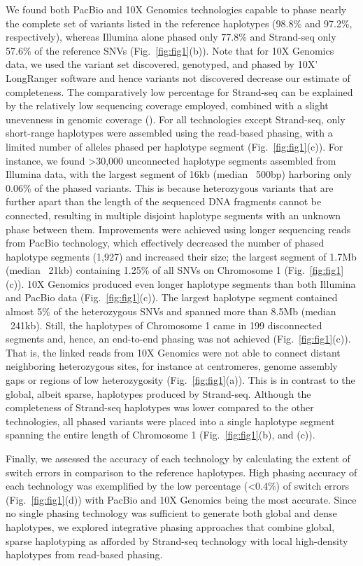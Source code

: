 	
	We found both PacBio and 10X Genomics technologies capable to phase nearly the complete set of variants listed in the reference haplotypes (98.8\% and 97.2\%, respectively), 
	whereas Illumina alone phased only 77.8\% and Strand-seq only 57.6\% of the reference SNVs (Fig.~\ref{fig:fig1}(b)). 
	Note that for 10X Genomics data, we used the variant set discovered, genotyped, and phased by 10X’ LongRanger software and hence variants not discovered decrease our estimate of completeness.
	The comparatively low percentage for Strand-seq can be explained by the relatively low sequencing coverage employed, combined with a slight unevenness in genomic coverage (). 
	For all technologies except Strand-seq, only short-range haplotypes were assembled using the read-based phasing, with a limited number of alleles phased per haplotype segment (Fig.~\ref{fig:fig1}(c)). 
	For instance, we found >30,000 unconnected haplotype segments assembled from Illumina data, with the largest segment of 16kb (median ~500bp) harboring only 0.06\% of the phased variants. 
	This is because heterozygous variants that are further apart than the length of the sequenced DNA fragments cannot be connected, resulting in multiple disjoint haplotype segments with an unknown phase between them. 
	Improvements were achieved using longer sequencing reads from PacBio technology, which effectively decreased the number of phased haplotype segments (1,927) and increased their size; the largest segment of 1.7Mb (median ~21kb) 
	containing 1.25\% of all SNVs on Chromosome 1 (Fig.~\ref{fig:fig1}(c)). 10X Genomics produced even longer haplotype segments than both Illumina and PacBio data (Fig.~\ref{fig:fig1}(c)). 
	The largest haplotype segment contained almost 5\% of the heterozygous SNVs and spanned more than 8.5Mb (median ~241kb). Still, the haplotypes of Chromosome 1 came in 199 disconnected segments and, 
	hence, an end-to-end phasing was not achieved (Fig.~\ref{fig:fig1}(c)). That is, the linked reads from 10X Genomics were not able to connect distant neighboring heterozygous sites, for instance at centromeres, 
	genome assembly gaps or regions of low heterozygosity (Fig.~\ref{fig:fig1}(a)). 
	This is in contrast to the global, albeit sparse, haplotypes produced by Strand-seq. 
	Although the completeness of Strand-seq haplotypes was lower compared to the other technologies, all phased variants were placed into a single haplotype segment spanning the entire length of Chromosome 1 (Fig.~\ref{fig:fig1}(b), and (c)).
	
	
	Finally, we assessed the accuracy of each technology by calculating the extent of switch errors in comparison to the reference haplotypes. High phasing accuracy of each technology was exemplified by the low percentage (<0.4\%) 
	of switch errors (Fig.~\ref{fig:fig1}(d)) with PacBio and 10X Genomics being the most accurate. 
	Since no single phasing technology was sufficient to generate both global and dense haplotypes, 
	we explored integrative phasing approaches that combine global, sparse haplotyping as afforded by Strand-seq technology with local high-density haplotypes from read-based phasing.
	
